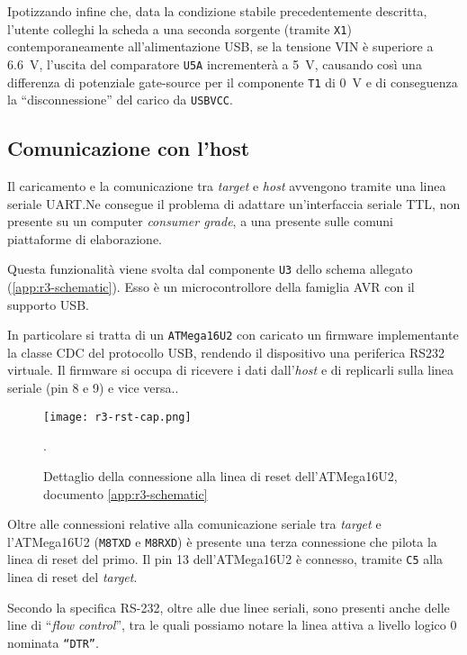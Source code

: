 Ipotizzando infine che, data la condizione stabile precedentemente descritta, l'utente colleghi la scheda a una seconda sorgente (tramite \texttt{X1}) contemporaneamente all'alimentazione USB, se la tensione VIN è superiore a \SI{6.6}{\volt}, l'uscita del comparatore \texttt{U5A} incrementerà a \SI{5}{\volt}, causando così una differenza di potenziale gate-source per il componente \texttt{T1} di \SI{0}{\volt} e di conseguenza la ``disconnessione'' del carico da \texttt{USBVCC}.

\subsection{Comunicazione con l'host}

Il caricamento e la comunicazione tra \textit{target} e \textit{host} avvengono tramite una linea seriale UART.\@ Ne consegue il problema di adattare un'interfaccia seriale TTL, non presente su un computer \textit{consumer grade}, a una presente sulle comuni piattaforme di elaborazione.

Questa funzionalità viene svolta dal componente \texttt{U3} dello schema allegato (\ref{app:r3-schematic}). Esso è un microcontrollore della famiglia AVR con il supporto USB.\@

In particolare si tratta di un \texttt{ATMega16U2} con caricato un firmware implementante la classe CDC del protocollo USB, rendendo il dispositivo una periferica RS232 virtuale.
Il firmware si occupa di ricevere i dati dall'\textit{host} e di replicarli sulla linea seriale (pin 8 e 9) e vice versa.\cite[firmwares/atmegaxxu2/arduino-usbserial/]{git:arduinocore}.

\begin{figure}[t]
    \centering
    \texttt{[image: r3-rst-cap.png]}
    \caption[Dettaglio dello schema elettronico posto in appendice, documento~\ref{app:r3-schematic}]{Dettaglio della connessione alla linea di reset dell'ATMega16U2, documento \ref{app:r3-schematic}~\cite{site:r3-schematic}}\label{fig:r3-schematic-rst-detail}.
\end{figure}


Oltre alle connessioni relative alla comunicazione seriale tra \textit{target} e l'ATMega16U2 (\texttt{M8TXD} e \texttt{M8RXD}) è presente una terza connessione che pilota la linea di reset del primo. Il pin 13 dell'ATMega16U2 è connesso, tramite \texttt{C5} alla linea di reset del \textit{target}.

Secondo la specifica RS-232, oltre alle due linee seriali, sono presenti anche delle line di ``\textit{flow control}'', tra le quali possiamo notare la linea attiva a livello logico 0 nominata \texttt{``DTR''}.

